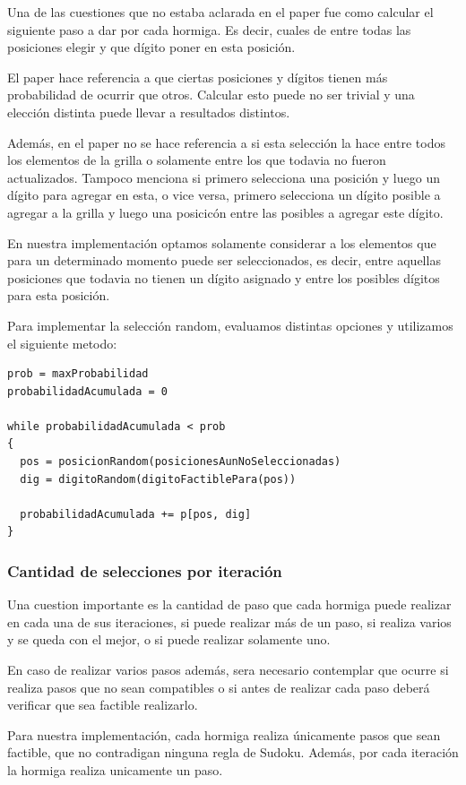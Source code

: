 \documentclass[a4paper,spanish]{article}
\begin{document}
Una de las cuestiones que no estaba aclarada en el paper fue como calcular el siguiente paso a dar por cada hormiga.
Es decir, cuales de entre todas las posiciones elegir y que dígito poner en esta posición.

El paper hace referencia a que ciertas posiciones y dígitos tienen más probabilidad de ocurrir que otros. Calcular esto
puede no ser trivial y una elección distinta puede llevar a resultados distintos.

Además, en el paper no se hace referencia a si esta selección la hace entre todos los elementos de la grilla o solamente 
entre los que todavia no fueron actualizados. Tampoco menciona si primero selecciona una posición y luego un dígito para 
agregar en esta, o vice versa, primero selecciona un dígito posible a agregar a la grilla y luego una posicicón entre
las posibles a agregar este dígito.

En nuestra implementación optamos solamente considerar a los elementos que para un determinado momento puede ser seleccionados, 
es decir, entre aquellas posiciones que todavia no tienen un dígito asignado y entre los posibles dígitos para esta posición.

Para implementar la selección random, evaluamos distintas opciones y utilizamos el siguiente metodo:


\begin{verbatim}
prob = maxProbabilidad
probabilidadAcumulada = 0

while probabilidadAcumulada < prob 
{
  pos = posicionRandom(posicionesAunNoSeleccionadas)
  dig = digitoRandom(digitoFactiblePara(pos))

  probabilidadAcumulada += p[pos, dig]
}
\end{verbatim}

\subsubsection{Cantidad de selecciones por iteración}

Una cuestion importante es la cantidad de paso que cada hormiga puede realizar en cada una de sus iteraciones, si puede
realizar más de un paso, si realiza varios y se queda con el mejor, o si puede realizar solamente uno.

En caso de realizar varios pasos además, sera necesario contemplar que ocurre si realiza pasos que no sean compatibles o si 
antes de realizar cada paso deberá verificar que sea factible realizarlo.

Para nuestra implementación, cada hormiga realiza únicamente pasos que sean factible, que no contradigan ninguna regla
de Sudoku. Además, por cada iteración la hormiga realiza unicamente un paso.
\end{document}
